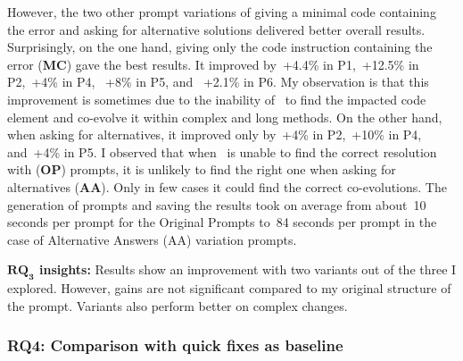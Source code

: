 However, the two other prompt variations of giving a minimal code containing the error and asking for alternative solutions delivered better overall results. 
Surprisingly, on the one hand, giving only the code instruction containing the error (\textbf{MC}) gave the best results. It improved by~+4.4\% in P1,~+12.5\% in P2,~+4\% in P4, ~+8\% in P5, and ~+2.1\% in P6. 
My observation is that this improvement is sometimes due to the inability of \LLM~to find the impacted code element and co-evolve it within complex and long methods. 
On the other hand, when asking for alternatives, it improved only by~+4\% in P2,~+10\% in P4, and~+4\% in P5. I observed that when \LLM~is unable to find the correct resolution with (\textbf{OP}) prompts, it is unlikely to find the right one when asking for alternatives (\textbf{AA}). Only in few cases it could find the correct co-evolutions.  %
The generation of prompts and saving the results took on average from about~10 seconds per prompt for the Original Prompts to~84 seconds per prompt in the case of Alternative Answers (AA) variation prompts.



\begin{tcolorbox}[boxsep=-2pt]
	\textbf{$\boldsymbol{RQ_3}$ insights:}
	Results show an improvement with two variants out of the three I explored. However, gains are not significant compared to my original structure of the prompt. 
	Variants also perform better on complex changes. 
\end{tcolorbox}

\subsubsection{RQ4: Comparison with quick fixes as baseline}


